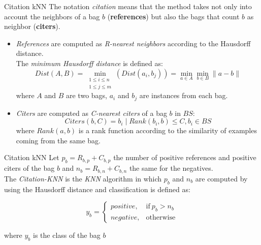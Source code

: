 \begin{frame}{Citation kNN}
	The notation \textit{citation} means that the method takes not only into account the neighbors of a bag $b$ (\textbf{references}) but also the bags that count $b$ as neighbor (\textbf{citers}).
	
	\begin{itemize}
		\item \textit{References} are computed as \textit{R-nearest neighbors} according to the Hausdorff distance.\\
		The \textit{minimum Hausdorff distance} is defined as:
		$$Dist(A,B)=\min_{\substack{1\le i\le n \\ 1\le j\le m}}(Dist(a_i,b_j))=\min_{a\in A}\min_{b\in B}\lVert a-b \rVert$$
		where $A$ and $B$ are two bags, $a_i$ and $b_j$ are instances from each bag.
		\item \textit{Citers} are computed as \textit{C-nearest citers} of a bag $b$ in $BS$:
		$$Citers(b,C)={b_i\mid Rank(b_i,b)\le C, b_i\in BS}$$ 
		where $Rank(a,b)$ is a rank function according to the similarity of examples coming from the same bag.
	\end{itemize}

	
\end{frame}

\begin{frame}{Citation kNN}
	Let $p_b = R_{b,p} + C_{b,p}$ the number of positive references and positive citers of the bag $b$ and $n_b = R_{b,n} + C_{b,n}$ the same for the negatives.\\
	\vspace{10px}
	The \textit{Citation-KNN} is the \textit{KNN} algorithm in which $p_b$ and $n_b$ are computed by using the Hausdorff distance and classification is defined as:
	
	$$y_b = 
	\begin{cases}
		positive, & \mbox{if} \ p_b > n_b\\
		negative, & \mbox{otherwise}
	\end{cases}$$
	
	where $y_b$ is the class of the bag $b$
	
	\begin{flushright}
		\cite{miknn}
	\end{flushright}
\end{frame}

